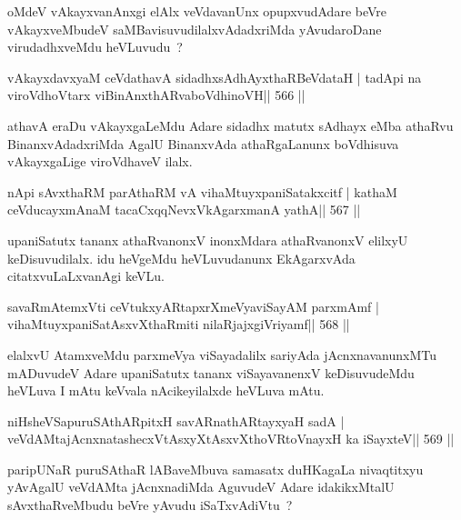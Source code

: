 \begin{artha}
oMdeV vAkayxvanAnxgi elAlx veVdavanUnx opupxvudAdare beVre 
vAkayxveMbudeV
saMBavisuvudilalxvAdadxriMda yAvudaroDane virudadhxveMdu heVLuvudu~?
\end{artha}

\begin{shl}
vAkayxdavxyaM ceVdathavA sidadhxsAdhAyxthaRBeVdataH |
tadA\s pi na viroVdhoV\s tarx viBinAnxthARvaboVdhinoVH\hfill || 566 ||
\end{shl}

\begin{artha}
athavA eraDu vAkayxgaLeMdu Adare sidadhx matutx sAdhayx eMba athaRvu BinanxvAdadxriMda AgalU BinanxvAda athaRgaLanunx boVdhisuva vAkayxgaLige viroVdhaveV ilalx.
\end{artha}

\begin{shl}
nApi sAvxthaRM parAthaRM vA vihaMtuyxpaniSatakxcitf |
kathaM ceVducayxmAnaM tacaCxqqNevxVkAgarxmanA yathA\hfill || 567 ||
\end{shl}

\begin{artha}
upaniSatutx tananx athaRvanonxV inonxMdara athaRvanonxV elilxyU keDisuvudilalx. idu heVgeMdu heVLuvudanunx EkAgarxvAda citatxvuLaLxvanAgi keVLu.
\end{artha}

\begin{shl}
savaRmAtemxVti ceVtukxyARtapxrXmeVyaviSayAM parxmAmf |
vihaMtuyxpaniSatAsxvXthaRmiti nilaRjajxgiVriyamf\hfill || 568 ||
\end{shl}

\begin{artha}
elalxvU AtamxveMdu parxmeVya viSayadalilx sariyAda jAcnxnavanunxMTu mADuvudeV Adare upaniSatutx tananx viSayavanenxV keDisuvudeMdu heVLuva I mAtu keVvala nAcikeyilalxde heVLuva mAtu.
\end{artha}

\begin{shl}
niHsheVSapuruSAthARpitxH savARnathARtayxyaH sadA |
veVdAMtajAcnxnatashecxVtAsxyXtAsxvXthoVR\s toV\s nayxH ka iSayxteV\hfill || 569 ||
\end{shl}

\begin{artha}
paripUNaR puruSAthaR lABaveMbuva samasatx duHKagaLa nivaqtitxyu yAvAgalU
veVdAMta jAcnxnadiMda AguvudeV Adare idakikxMtalU sAvxthaRveMbudu
beVre yAvudu iSaTxvAdiVtu~?
\end{artha}

